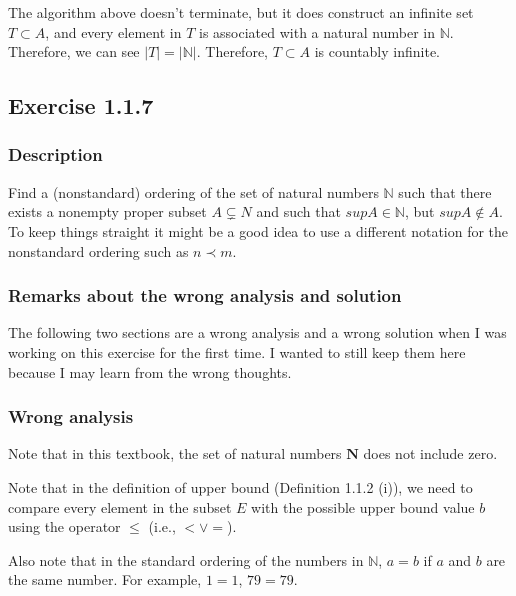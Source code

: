 \documentclass[12pt, letterpaper, oneside]{book}
\begin{document}
The algorithm above doesn't terminate, but it does construct an infinite set $T \subset A$, and every element in $T$ is
associated with a natural number in $\mathbb{N}$. Therefore, we can see $|T| = |\mathbb{N}|$. Therefore, $T \subset A$
is countably infinite.

\subsection{Exercise 1.1.7}

\subsubsection{Description}

Find a (nonstandard) ordering of the set of natural numbers $\mathbb{N}$ such that there exists a nonempty proper
subset $A \subsetneq N$ and such that $sup A \in \mathbb{N}$, but $sup A \notin A$. To keep things straight it might be
a good idea to use a different notation for the nonstandard ordering such as $n \prec m$.

\subsubsection{Remarks about the wrong analysis and solution}

The following two sections are a wrong analysis and a wrong solution when I was working on this exercise for the first
time. I wanted to still keep them here because I may learn from the wrong thoughts.

\subsubsection{Wrong analysis}

Note that in this textbook, the set of natural numbers $\mathbf{N}$ does not include zero.

Note that in the definition of upper bound (Definition 1.1.2 (i)), we need to compare every element in the subset $E$
with the possible upper bound value $b$ using the operator $\le$ (i.e., $< \lor =$).

Also note that in the standard ordering of the numbers in $\mathbb{N}$, $a = b$ if $a$ and $b$ are the same number. For
example, $1 = 1$, $79 = 79$.
\end{document}
